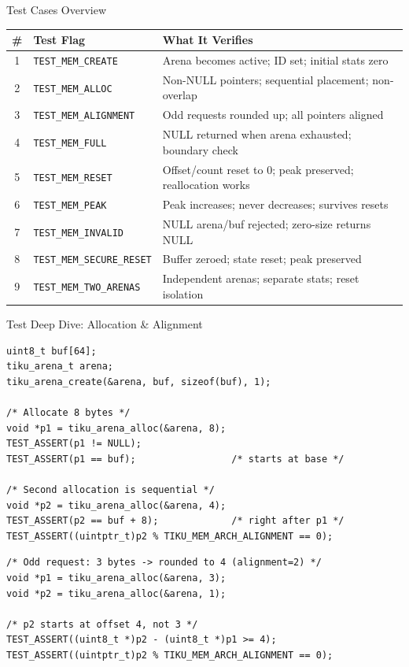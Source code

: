 \documentclass[aspectratio=169, 10pt]{beamer}
\begin{document}
\begin{frame}{Test Cases Overview}
\begin{table}
\centering
\small
\begin{tabular}{@{}clp{7cm}@{}}
\toprule
\textbf{\#} & \textbf{Test Flag} & \textbf{What It Verifies} \\
\midrule
1 & \texttt{TEST\_MEM\_CREATE}    & Arena becomes active; ID set; initial stats zero \\
2 & \texttt{TEST\_MEM\_ALLOC}     & Non-NULL pointers; sequential placement; non-overlap \\
3 & \texttt{TEST\_MEM\_ALIGNMENT} & Odd requests rounded up; all pointers aligned \\
4 & \texttt{TEST\_MEM\_FULL}      & NULL returned when arena exhausted; boundary check \\
5 & \texttt{TEST\_MEM\_RESET}     & Offset/count reset to 0; peak preserved; reallocation works \\
6 & \texttt{TEST\_MEM\_PEAK}      & Peak increases; never decreases; survives resets \\
7 & \texttt{TEST\_MEM\_INVALID}   & NULL arena/buf rejected; zero-size returns NULL \\
8 & \texttt{TEST\_MEM\_SECURE\_RESET} & Buffer zeroed; state reset; peak preserved \\
9 & \texttt{TEST\_MEM\_TWO\_ARENAS}   & Independent arenas; separate stats; reset isolation \\
\bottomrule
\end{tabular}
\end{table}
\end{frame}

\begin{frame}[fragile]{Test Deep Dive: Allocation \& Alignment}
\begin{lstlisting}[style=cstyle, title={test\_tiku\_mem.c --- Allocation test}]
uint8_t buf[64];
tiku_arena_t arena;
tiku_arena_create(&arena, buf, sizeof(buf), 1);

/* Allocate 8 bytes */
void *p1 = tiku_arena_alloc(&arena, 8);
TEST_ASSERT(p1 != NULL);
TEST_ASSERT(p1 == buf);                 /* starts at base */

/* Second allocation is sequential */
void *p2 = tiku_arena_alloc(&arena, 4);
TEST_ASSERT(p2 == buf + 8);             /* right after p1 */
TEST_ASSERT((uintptr_t)p2 % TIKU_MEM_ARCH_ALIGNMENT == 0);
\end{lstlisting}

\begin{lstlisting}[style=cstyle, title={test\_tiku\_mem.c --- Alignment test}]
/* Odd request: 3 bytes -> rounded to 4 (alignment=2) */
void *p1 = tiku_arena_alloc(&arena, 3);
void *p2 = tiku_arena_alloc(&arena, 1);

/* p2 starts at offset 4, not 3 */
TEST_ASSERT((uint8_t *)p2 - (uint8_t *)p1 >= 4);
TEST_ASSERT((uintptr_t)p2 % TIKU_MEM_ARCH_ALIGNMENT == 0);
\end{lstlisting}
\end{frame}
\end{document}
